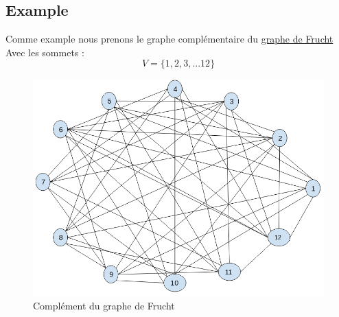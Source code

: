 \documentclass{article}
\begin{document}
\subsection{Example}
Comme example nous prenons le graphe complémentaire du \href{https://en.wikipedia.org/wiki/Frucht\_graph}{graphe de Frucht}
Avec les sommets :
\begin{displaymath}
  V=\{1,2,3,...12\}
\end{displaymath}
\begin{center}
  \begin{figure}[!htp]
    \caption{Complément du graphe de Frucht}
    \includegraphics[scale=0.5]{Report/frucht-compl.png}
  \end{figure}
\end{center}
\end{document}
